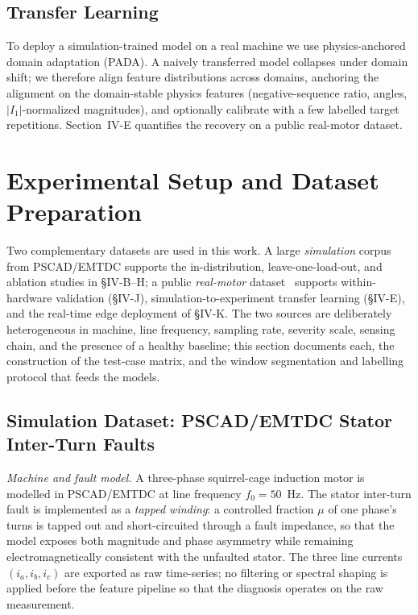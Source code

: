 \documentclass[journal]{IEEEtran}
\begin{document}
\subsection{Transfer Learning}
To deploy a simulation-trained model on a real machine we use physics-anchored domain adaptation (PADA).
A naively transferred model collapses under domain shift; we therefore align feature distributions
across domains, anchoring the alignment on the domain-stable physics features (negative-sequence ratio,
angles, $|I_1|$-normalized magnitudes), and optionally calibrate with a few labelled target repetitions.
Section~IV-E quantifies the recovery on a public real-motor dataset.

\section{Experimental Setup and Dataset Preparation}

Two complementary datasets are used in this work. A large \emph{simulation} corpus from
PSCAD/EMTDC supports the in-distribution, leave-one-load-out, and ablation studies in
\S IV-B--H; a public \emph{real-motor} dataset~\cite{ibarram} supports within-hardware
validation (\S IV-J), simulation-to-experiment transfer learning (\S IV-E), and the
real-time edge deployment of \S IV-K. The two sources are deliberately heterogeneous in
machine, line frequency, sampling rate, severity scale, sensing chain, and the presence
of a healthy baseline; this section documents each, the construction of the test-case
matrix, and the window segmentation and labelling protocol that feeds the models.

\subsection{Simulation Dataset: PSCAD/EMTDC Stator Inter-Turn Faults}
\label{sec:simset}
\emph{Machine and fault model.} A three-phase squirrel-cage induction motor is modelled in
PSCAD/EMTDC at line frequency $f_0=50$~Hz. The stator inter-turn fault is implemented as a
\emph{tapped winding}: a controlled fraction $\mu$ of one phase's turns is tapped out and
short-circuited through a fault impedance, so that the model exposes both magnitude and
phase asymmetry while remaining electromagnetically consistent with the unfaulted stator.
The three line currents $(i_a, i_b, i_c)$ are exported as raw time-series; no filtering or
spectral shaping is applied before the feature pipeline so that the diagnosis operates on
the raw measurement.
\end{document}
